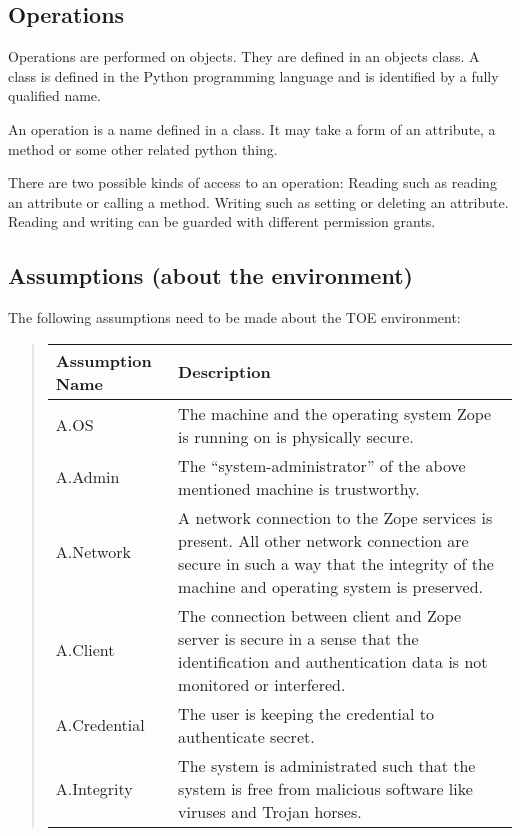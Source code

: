 \documentclass[10pt,a4paper,english]{article}
\newlength{\locallinewidth}
\begin{document}

\hypertarget{operations}{}
\subsection*{Operations}

Operations are performed on objects. They are defined in an objects class. A
class is defined in the Python programming language and is identified by a
fully qualified name.

An operation is a name defined in a class. It may take a form of an attribute, a
method or some other related python thing.

There are two possible kinds of access to an operation: Reading such as
reading an attribute or calling a method. Writing such as setting or deleting
an attribute. Reading and writing can be guarded with different permission grants.



\hypertarget{assumptions-about-the-environment}{}
\subsection*{Assumptions (about the environment)}

The following assumptions need to be made about the TOE environment:
\begin{quote}

\begin{longtable}[c]{|p{0.19\locallinewidth}|p{0.61\locallinewidth}|}
\hline
\textbf{
Assumption Name
} & \textbf{
Description
} \\
\hline
\endhead

A.OS
 & 
The machine and the operating system Zope is
running on is physically secure.
 \\
\hline

A.Admin
 & 
The ``system-administrator'' of the above
mentioned machine is trustworthy.
 \\
\hline

A.Network
 & 
A network connection to the Zope services is
present. All other network connection are
secure in such a way that the integrity of
the machine and operating system is preserved.
 \\
\hline

A.Client
 & 
The connection between client and Zope server is
secure in a sense that the identification and
authentication data is not monitored or interfered.
 \\
\hline

A.Credential
 & 
The user is keeping the credential to authenticate
secret.
 \\
\hline

A.Integrity
 & 
The system is administrated such that the system is
free from malicious software like viruses and
Trojan horses.
 \\
\hline
\end{longtable}
\end{quote}
\end{document}
